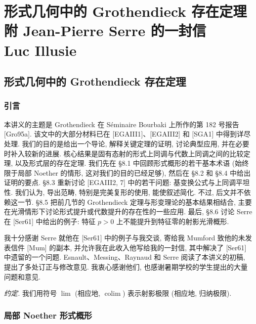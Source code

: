 \part[\parttoc{形式几何中的 Grothendieck 存在定理, 附 Jean-Pierre Serre 的一封信}{Luc Illusie}]{%
%
形式几何中的 Grothendieck 存在定理\\[1em]{\large 附 Jean-Pierre Serre 的一封信}\\[1em]{\large Luc Illusie}}
\chapter{形式几何中的 Grothendieck 存在定理}\label{ch08:chapter}
\section*{引言}
本讲义的主题是 Grothendieck 在 Séminaire Bourbaki 上所作的第 182 号报告 [Gro95a]. 该文中的大部分材料已在 [EGAIII1]、[EGAIII2] 和 [SGA1] 中得到详尽处理. 我们的目的是给出一个导论, 解释关键定理的证明, 讨论典型应用, 并在必要时补入较新的进展. 核心结果是固有态射的形式上同调与代数上同调之间的比较定理, 以及形式层的存在定理. 我们先在 §8.1 中回顾形式概形的若干基本术语 (始终限于局部 Noether 的情形, 这对我们的目的已经足够), 然后在 §8.2 和 §8.4 中给出证明的要点. §8.3 重新讨论 [EGAIII2, 7] 中的若干问题: 基变换公式与上同调平坦性. 我们认为, 导出范畴, 特别是完美复形的使用, 能使叙述简化. 不过, 后文并不依赖这一节. §8.5 把前几节的 Grothendieck 定理与形变理论的基本结果相结合, 主要在光滑情形下讨论形式提升或代数提升的存在性的一些应用. 最后, §8.6 讨论 Serre 在 [Ser61] 中给出的例子: 特征 $p>0$ 上不能提升到特征零的射影光滑概形.

我十分感谢 Serre 就他在 [Ser61] 中的例子与我交谈, 寄给我 Mumford 致他的未发表信件 [Mum] 的副本, 并允许我在此收入他写给我的一封信, 其中解决了 [Ser61] 中遗留的一个问题. Esnault、Messing、Raynaud 和 Serre 阅读了本讲义的初稿, 提出了多处订正与修改意见. 我衷心感谢他们, 也感谢暑期学校的学生提出的大量问题和意见.

\emph{约定.} 我们用符号 $\lim$ (相应地, $\operatorname{colim}$) 表示射影极限 (相应地, 归纳极限).

\section{局部 Noether 形式概形}\label{ch08:sec81}
